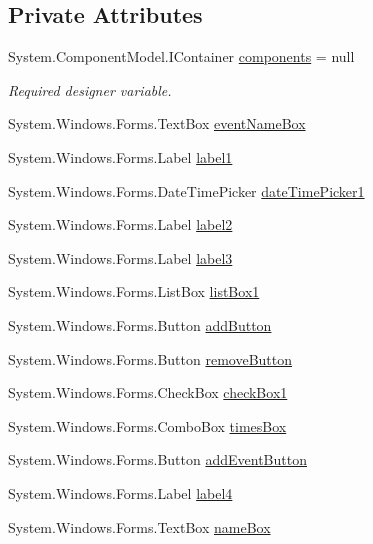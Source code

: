 \subsection*{Private Attributes}
\begin{DoxyCompactItemize}
\item 
System.\+Component\+Model.\+I\+Container \hyperlink{classProject1_1_1EventInfo_a70368824a7f92cc152cc1371ebd6e5f1}{components} = null
\begin{DoxyCompactList}\small\item\em Required designer variable. \end{DoxyCompactList}\item 
System.\+Windows.\+Forms.\+Text\+Box \hyperlink{classProject1_1_1EventInfo_ade60ccc9dc0e3789c0323820d368f667}{event\+Name\+Box}
\item 
System.\+Windows.\+Forms.\+Label \hyperlink{classProject1_1_1EventInfo_ab0c0388a63ceddd8ecde61ce4e00ffe8}{label1}
\item 
System.\+Windows.\+Forms.\+Date\+Time\+Picker \hyperlink{classProject1_1_1EventInfo_ad9fd1f5363989b649ffe1681afda852c}{date\+Time\+Picker1}
\item 
System.\+Windows.\+Forms.\+Label \hyperlink{classProject1_1_1EventInfo_a27ead48983981a1f8e4d936ad0a113eb}{label2}
\item 
System.\+Windows.\+Forms.\+Label \hyperlink{classProject1_1_1EventInfo_a5489960f8593264df7d3a32fc362c95e}{label3}
\item 
System.\+Windows.\+Forms.\+List\+Box \hyperlink{classProject1_1_1EventInfo_a229ac9e88dea0086ae9055095dc98da4}{list\+Box1}
\item 
System.\+Windows.\+Forms.\+Button \hyperlink{classProject1_1_1EventInfo_a1b28ec9d90e8ff63e7589515f7b6f64a}{add\+Button}
\item 
System.\+Windows.\+Forms.\+Button \hyperlink{classProject1_1_1EventInfo_ae3ecbf994b93d37b2d6e42fcb0631ef0}{remove\+Button}
\item 
System.\+Windows.\+Forms.\+Check\+Box \hyperlink{classProject1_1_1EventInfo_ace75bf4615d0f8add3e53b6791fb671c}{check\+Box1}
\item 
System.\+Windows.\+Forms.\+Combo\+Box \hyperlink{classProject1_1_1EventInfo_ad368077ede71cc2fb15a34a5a95ac978}{times\+Box}
\item 
System.\+Windows.\+Forms.\+Button \hyperlink{classProject1_1_1EventInfo_a3a841021c735952afd4c491508540c62}{add\+Event\+Button}
\item 
System.\+Windows.\+Forms.\+Label \hyperlink{classProject1_1_1EventInfo_ac29d91498e302af75fe8690676184646}{label4}
\item 
System.\+Windows.\+Forms.\+Text\+Box \hyperlink{classProject1_1_1EventInfo_aec872f7ab76768098f8d007d4258c7de}{name\+Box}
\end{DoxyCompactItemize}


